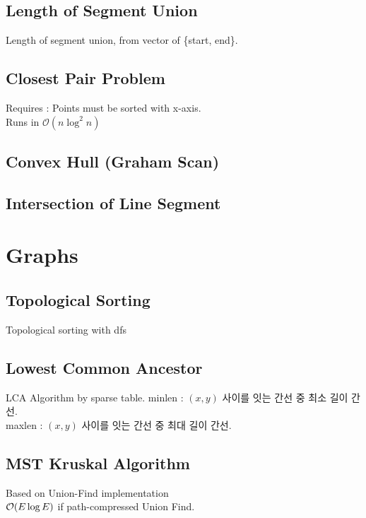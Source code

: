 \documentclass[landscape,8pt]{article}
\begin{document}
\begin{multicols}{2}
  \subsection{Length of Segment Union}
    Length of segment union, from vector of \{start, end\}.
    
  \subsection{Closest Pair Problem}
    Requires : Points must be sorted with x-axis.\\
    Runs in $\mathcal{O}(n \log^2 n)$
    
  \subsection{Convex Hull (Graham Scan)}
    
  \subsection{Intersection of Line Segment}
    
\columnbreak

\section{Graphs}
  \subsection{Topological Sorting}
  Topological sorting with dfs
    

  \subsection{Lowest Common Ancestor}
  LCA Algorithm by sparse table.
  minlen : $(x, y)$ 사이를 잇는 간선 중 최소 길이 간선. \\
  maxlen : $(x, y)$ 사이를 잇는 간선 중 최대 길이 간선.
    

  \subsection{MST Kruskal Algorithm}
  Based on Union-Find implementation\\
  $\order{E \log E}$ if path-compressed Union Find.
    


\end{multicols}
\end{document}
